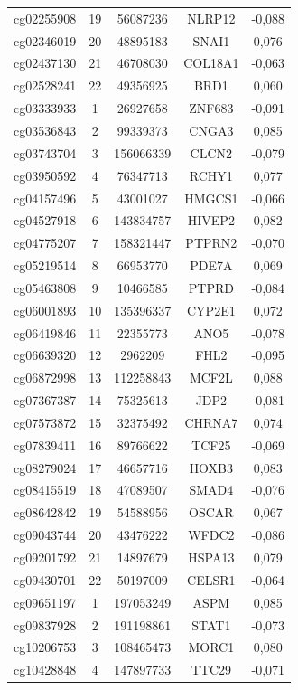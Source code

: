 \documentclass[12pt,a4paper]{article}
\begin{document}
\begin{longtable}{|c|c|c|c|c|}
		cg02255908 & 19 & 56087236 & NLRP12 & -0,088 \\
		cg02346019 & 20 & 48895183 & SNAI1 & 0,076 \\
		cg02437130 & 21 & 46708030 & COL18A1 & -0,063 \\
		cg02528241 & 22 & 49356925 & BRD1 & 0,060 \\
		cg03333933 & 1 & 26927658 & ZNF683 & -0,091 \\
		cg03536843 & 2 & 99339373 & CNGA3 & 0,085 \\
		cg03743704 & 3 & 156066339 & CLCN2 & -0,079 \\
		cg03950592 & 4 & 76347713 & RCHY1 & 0,077 \\
		cg04157496 & 5 & 43001027 & HMGCS1 & -0,066 \\
		cg04527918 & 6 & 143834757 & HIVEP2 & 0,082 \\
		cg04775207 & 7 & 158321447 & PTPRN2 & -0,070 \\
		cg05219514 & 8 & 66953770 & PDE7A & 0,069 \\
		cg05463808 & 9 & 10466585 & PTPRD & -0,084 \\
		cg06001893 & 10 & 135396337 & CYP2E1 & 0,072 \\
		cg06419846 & 11 & 22355773 & ANO5 & -0,078 \\
		cg06639320 & 12 & 2962209 & FHL2 & -0,095 \\
		cg06872998 & 13 & 112258843 & MCF2L & 0,088 \\
		cg07367387 & 14 & 75325613 & JDP2 & -0,081 \\
		cg07573872 & 15 & 32375492 & CHRNA7 & 0,074 \\
		cg07839411 & 16 & 89766622 & TCF25 & -0,069 \\
		cg08279024 & 17 & 46657716 & HOXB3 & 0,083 \\
		cg08415519 & 18 & 47089507 & SMAD4 & -0,076 \\
		cg08642842 & 19 & 54588956 & OSCAR & 0,067 \\
		cg09043744 & 20 & 43476222 & WFDC2 & -0,086 \\
		cg09201792 & 21 & 14897679 & HSPA13 & 0,079 \\
		cg09430701 & 22 & 50197009 & CELSR1 & -0,064 \\
		cg09651197 & 1 & 197053249 & ASPM & 0,085 \\
		cg09837928 & 2 & 191198861 & STAT1 & -0,073 \\
		cg10206753 & 3 & 108465473 & MORC1 & 0,080 \\
		cg10428848 & 4 & 147897733 & TTC29 & -0,071 \\

\end{longtable}
\end{document}
